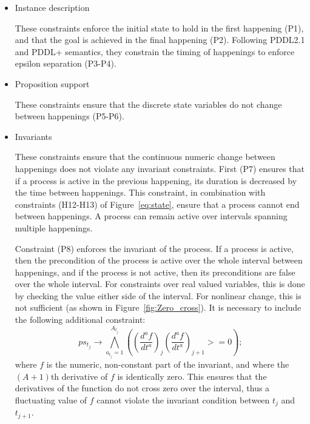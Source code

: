 
\begin{itemize}

\item Instance description

These constraints enforce the initial state to hold in the first happening (P1), and that the goal is achieved in the final happening (P2). Following PDDL2.1 and PDDL+ semantics, they constrain the timing of happenings to enforce epsilon separation (P3-P4).

\item Proposition support

These constraints ensure that the discrete state variables do not change between happenings (P5-P6).

\item Invariants

These constraints ensure that the continuous numeric change between happenings does not violate any invariant constraints. First (P7) ensures that if a process is active in the previous happening, its duration is decreased by the time between happenings. This constraint, in combination with constraints (H12-H13) of Figure~\ref{eq:state}, ensure that a process cannot end between happenings. A process can remain active over intervals spanning multiple happenings.

Constraint (P8) enforces the invariant of the process. If a process is active, then the precondition of the process is active over the whole interval between happenings, and if the process is not active, then its preconditions are false over the whole interval. For constraints over real valued variables, this is done by checking the value either side of the interval. For nonlinear change, this is not sufficient (as shown in Figure~\ref{fig:Zero_cross}). It is necessary to include the following additional constraint:
$$
ps_{t_j} \rightarrow \bigwedge^{A_{t_j}}_{a_{t_j}=1} \left((\frac{d^af}{dt^a})_j(\frac{d^af}{dt^a})_{j+1} >= 0\right); 
$$
where $f$ is the numeric, non-constant part of the invariant, and where the $(A+1)$th derivative of $f$ is identically zero. This ensures that the derivatives of the function do not cross zero over the interval, thus a fluctuating value of $f$ cannot violate the invariant condition between $t_j$ and $t_{j+1}$.


\end{itemize}

